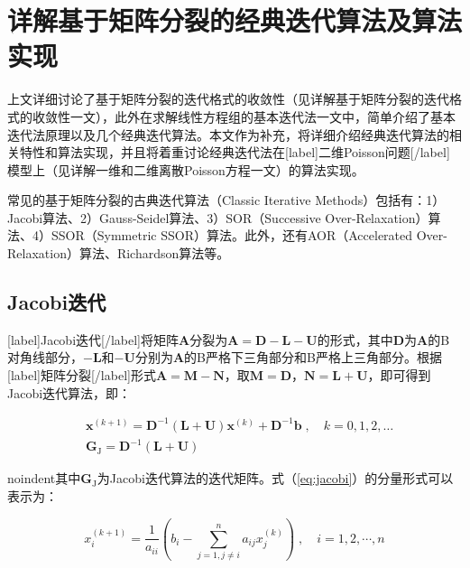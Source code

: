 \documentclass[12pt, UTF8, nofonts]{ctexart}
\begin{document}

\section*{详解基于矩阵分裂的经典迭代算法及算法实现}

上文详细讨论了基于矩阵分裂的迭代格式的收敛性（见详解基于矩阵分裂的迭代格式的收敛性一文），此外在求解线性方程组的基本迭代法一文中，简单介绍了基本迭代法原理以及几个经典迭代算法。本文作为补充，将详细介绍经典迭代算法的相关特性和算法实现，并且将着重讨论经典迭代法在[label]二维Poisson问题[/label]模型上（见详解一维和二维离散Poisson方程一文）的算法实现。

常见的基于矩阵分裂的古典迭代算法（Classic Iterative Methods）包括有：1）Jacobi算法、2）Gauss-Seidel算法、3）SOR（Successive Over-Relaxation）算法、4）SSOR（Symmetric SSOR）算法。此外，还有AOR（Accelerated Over-Relaxation）算法、Richardson算法等。

\subsection*{Jacobi迭代}

[label]Jacobi迭代[/label]将矩阵$\boldsymbol{A}$分裂为$\boldsymbol{A}=\boldsymbol{D}-\boldsymbol{L}-\boldsymbol{U}$的形式，其中$\boldsymbol{D}$为$\boldsymbol{A}$的B对角线部分，$-\boldsymbol{L}$和$-\boldsymbol{U}$分别为$\boldsymbol{A}$的B严格下三角部分和B严格上三角部分。根据[label]矩阵分裂[/label]形式$\boldsymbol{A}=\boldsymbol{M}-\boldsymbol{N}$，取$\boldsymbol{M}=\boldsymbol{D}$，$\boldsymbol{N}=\boldsymbol{L}+\boldsymbol{U}$，即可得到Jacobi迭代算法，即：

\begin{eqnarray}
    \label{eq:jacobi}
    & \boldsymbol{x}^{(k+1)} = \boldsymbol{D}^{-1}(\boldsymbol{L}+\boldsymbol{U})\boldsymbol{x}^{(k)}+\boldsymbol{D}^{-1}\boldsymbol{b} \;,\quad k=0,1,2,\ldots \\
    & \boldsymbol{G}_{\mathrm{J}}=\boldsymbol{D}^{-1}(\boldsymbol{L}+\boldsymbol{U})
\end{eqnarray}

noindent其中$\boldsymbol{G}_{\mathrm{J}}$为Jacobi迭代算法的迭代矩阵。式（\ref{eq:jacobi}）的分量形式可以表示为：

\begin{equation}
    \label{eq:jacobicomp}
    x_{i}^{(k+1)}=\dfrac{1}{a_{ii}}\left(b_i-\sum_{j=1,j \neq i}^na_{ij}x_j^{(k)}\right) \;,\quad i=1,2,\cdots,n
\end{equation}
\end{document}
